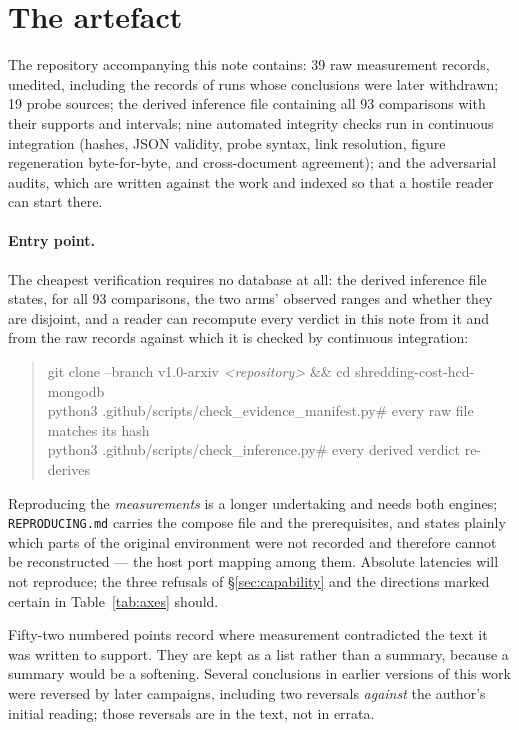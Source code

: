 \documentclass[11pt,a4paper]{article}
\newcommand{\code}[1]{\texttt{\small #1}}
\begin{document}
\section{The artefact}
\label{sec:artefact}

The repository accompanying this note contains: 39 raw measurement records, unedited, including the
records of runs whose conclusions were later withdrawn; 19 probe sources; the derived inference file
containing all 93 comparisons with their supports and intervals; nine automated integrity checks run
in continuous integration (hashes, JSON validity, probe syntax, link resolution, figure
regeneration byte-for-byte, and cross-document agreement); and the adversarial audits, which are
written against the work and indexed so that a hostile reader can start there.

\paragraph{Entry point.} The cheapest verification requires no database at all: the derived
inference file states, for all 93 comparisons, the two arms' observed ranges and whether they are
disjoint, and a reader can recompute every verdict in this note from it and from the raw records
against which it is checked by continuous integration:

\begin{quote}\small\ttfamily
git clone --branch v1.0-arxiv \textit{<repository>} \&\& cd shredding-cost-hcd-mongodb\\
python3 .github/scripts/check\_evidence\_manifest.py\quad\textrm{\# every raw file matches its hash}\\
python3 .github/scripts/check\_inference.py\quad\textrm{\# every derived verdict re-derives}
\end{quote}

\noindent Reproducing the \emph{measurements} is a longer undertaking and needs both engines;
\code{REPRODUCING.md} carries the compose file and the prerequisites, and states plainly which parts
of the original environment were not recorded and therefore cannot be reconstructed --- the host port
mapping among them. Absolute latencies will not reproduce; the three refusals of
\S\ref{sec:capability} and the directions marked certain in Table~\ref{tab:axes} should.

Fifty-two numbered points record where measurement contradicted the text it was written to support.
They are kept as a list rather than a summary, because a summary would be a softening. Several
conclusions in earlier versions of this work were reversed by later campaigns, including two
reversals \emph{against} the author's initial reading; those reversals are in the text, not in
errata.
\end{document}

